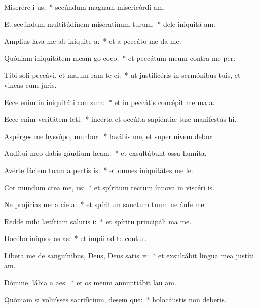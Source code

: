 \item Miserére i us,~* secúndum magnam misericórdi am.
\item Et secúndum multitúdinem miseratinum turum,~* dele iniquitá am.
\item Amplius lava me ab iniquite a:~* et a peccáto me da me.
\item Quóniam iniquitátem meam go coco:~* et peccátum meum contra me  per.
\item Tibi soli peccávi, et malum ram te ci:~* ut justificéris in sermónibus tuis, et vincas cum juris.
\item Ecce enim in iniquitáti con sum:~* et in peccátis concépit me ma a.
\item Ecce enim veritátem leti:~* incérta et occúlta sapiéntiæ tuæ manifestás hi.
\item Aspérges me hyssópo,  munbor:~* lavábis me, et super nivem debor.
\item Audítui meo dabis gáudium  læam:~* et exsultábunt ossa humita.
\item Avérte fáciem tuam a pectis is:~* et omnes iniquitátes me le.
\item Cor mundum crea  me, us:~* et spíritum rectum ínnova in viscéri is.
\item Ne projícias me a cie a:~* et spíritum sanctum tuum ne áufe  me.
\item Redde mihi lætítiam saluris i:~* et spíritu principáli ma me.
\item Docébo iníquos as as:~* et ímpii ad te contur.
\item Líbera me de sanguínibus, Deus, Deus satis æ:~* et exsultábit lingua mea justíti am.
\item Dómine, lábia a aes:~* et os meum annuntiábit lau am.
\item Quóniam si voluísses sacrifícium, desem que:~* holocáustis non deberis.
